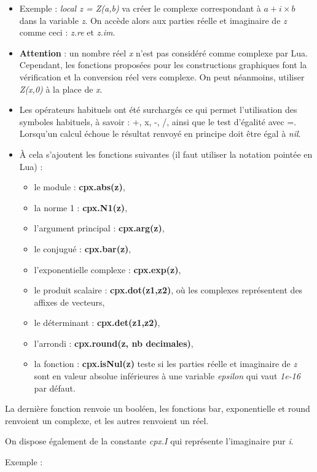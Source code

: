 \begin{itemize}
\item Exemple : \emph{local z = Z(a,b)} va créer le complexe correspondant à \(a+i\times b\) dans la variable \emph{z}. On accède alors aux parties réelle et imaginaire de \emph{z} comme ceci : \emph{z.re} et \emph{z.im}.
\item \textbf{Attention} : un nombre réel \emph{x} n'est pas considéré comme complexe par Lua. Cependant, les fonctions proposées pour les constructions graphiques font la vérification et la conversion réel vers complexe. On peut néanmoins, utiliser \emph{Z(x,0)} à la place de \emph{x}.
\item Les opérateurs habituels ont été surchargés ce qui permet l'utilisation des symboles habituels, à savoir : +, x, -, /, ainsi que le test d'égalité avec =. Lorsqu'un calcul échoue le résultat renvoyé en principe doit être égal à \emph{nil}.
\item À cela s'ajoutent les fonctions suivantes (il faut utiliser la notation pointée en Lua) :
  \begin{itemize}
  \item le module : \textbf{cpx.abs(z)},
  \item la norme 1 : \textbf{cpx.N1(z)},
  \item l'argument principal : \textbf{cpx.arg(z)},
  \item le conjugué : \textbf{cpx.bar(z)},
  \item l'exponentielle complexe : \textbf{cpx.exp(z)},
  \item le produit scalaire : \textbf{cpx.dot(z1,z2)}, où les complexes représentent des affixes de vecteurs,
  \item le déterminant : \textbf{cpx.det(z1,z2)},
  \item l'arrondi : \textbf{cpx.round(z, nb decimales)},
  \item la fonction : \textbf{cpx.isNul(z)} teste si les parties réelle et imaginaire de \emph{z} sont en valeur absolue inférieures à une variable \emph{epsilon} qui vaut \emph{1e-16} par défaut.
  \end{itemize}
\end{itemize}

La dernière fonction renvoie un booléen, les fonctions bar, exponentielle et round renvoient un complexe, et les autres renvoient un réel.

On dispose également de la constante \emph{cpx.I} qui représente l'imaginaire pur \emph{i}. 

Exemple :

